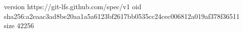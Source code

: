 version https://git-lfs.github.com/spec/v1
oid sha256:a2eaac3ad8be20aa1a5a6123bf2617bb0535cc24cec006812a019af378f36511
size 42256
